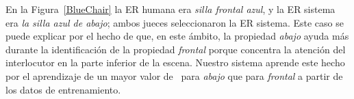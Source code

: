 \begin{table}[H]

En la Figura~\ref{BlueChair} la ER humana era {\it silla frontal azul}, y la ER sistema era {\it la silla azul de abajo}; ambos jueces seleccionaron la ER sistema. Este caso se puede explicar por el hecho de que, en este \'ambito, la propiedad {\it abajo} ayuda m\'as durante la identificaci\'on de la propiedad {\it frontal} porque concentra la atenci\'on del interlocutor en la parte inferior de la escena. Nuestro sistema aprende este hecho por el aprendizaje de un mayor valor de \puse\ para {\it abajo} que para {\it frontal} a partir de los datos de entrenamiento.


\end{table}
